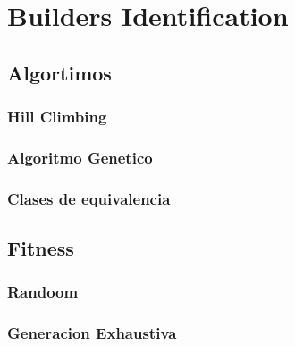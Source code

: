 \chapter[Builders Identification]{Builders Identification}
\label{cap:builders}

\section{Algortimos}
\subsection{Hill Climbing}
\subsection{Algoritmo Genetico}
\subsection{Clases de equivalencia}

\section{Fitness}
\subsection{Randoom}
\subsection{Generacion Exhaustiva}

